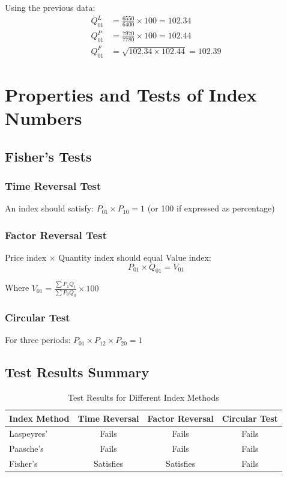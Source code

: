 \documentclass[twoside]{book}
\begin{document}
Using the previous data:
\begin{align}
    Q_{01}^L &= \frac{6550}{6400} \times 100 = 102.34 \\
    Q_{01}^P &= \frac{7970}{7780} \times 100 = 102.44 \\
    Q_{01}^F &= \sqrt{102.34 \times 102.44} = 102.39
\end{align}

\section{Properties and Tests of Index Numbers}

\subsection{Fisher's Tests}

\subsubsection{Time Reversal Test}
An index should satisfy: $P_{01} \times P_{10} = 1$ (or 100 if expressed as percentage)

\subsubsection{Factor Reversal Test}
Price index × Quantity index should equal Value index:
\begin{equation}
    P_{01} \times Q_{01} = V_{01}
\end{equation}

Where $V_{01} = \frac{\sum P_1 Q_1}{\sum P_0 Q_0} \times 100$

\subsubsection{Circular Test}
For three periods: $P_{01} \times P_{12} \times P_{20} = 1$

\subsection{Test Results Summary}

\begin{table}[h]
\centering
\caption{Test Results for Different Index Methods}
\begin{tabular}{lccc}
\toprule
\textbf{Index Method} & \textbf{Time Reversal} & \textbf{Factor Reversal} & \textbf{Circular Test} \\
\midrule
Laspeyres' & Fails & Fails & Fails \\
Paasche's & Fails & Fails & Fails \\
Fisher's & Satisfies & Satisfies & Fails \\
\bottomrule
\end{tabular}
\end{table}
\end{document}
